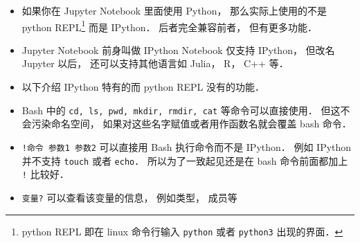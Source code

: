 
\begin{issues}
\issueDraft
\end{issues}

\begin{itemize}
\item 如果你在 Jupyter Notebook 里面使用 Python， 那么实际上使用的不是 python REPL\footnote{python REPL 即在 linux 命令行输入 \verb|python| 或者 \verb|python3| 出现的界面．} 而是 IPython． 后者完全兼容前者， 但有更多功能．
\item Jupyter Notebook 前身叫做 IPython Notebook 仅支持 IPython， 但改名 Jupyter 以后， 还可以支持其他语言如 Julia， R， C++ 等．
\item 以下介绍 IPython 特有的而 python REPL 没有的功能．
\item Bash 中的 \verb|cd, ls, pwd, mkdir, rmdir, cat| 等命令可以直接使用． 但这不会污染命名空间， 如果对这些名字赋值或者用作函数名就会覆盖 bash 命令．
\item \verb|!命令 参数1 参数2| 可以直接用 Bash 执行命令而不是 IPython． 例如 IPython 并不支持 \verb|touch| 或者 \verb|echo|． 所以为了一致起见还是在 bash 命令前面都加上 \verb|!| 比较好．
\item \verb|变量?| 可以查看该变量的信息， 例如类型， 成员等
\end{itemize}
